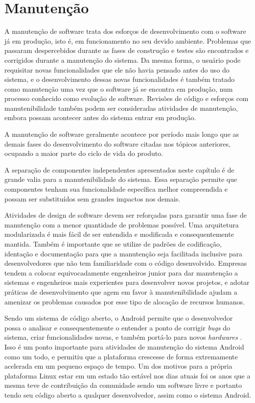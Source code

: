 \section{Manutenção}

A manutenção de software trata dos esforços de desenvolvimento com o software já em produção, isto é, em funcionamento no seu devido ambiente. Problemas que passaram despercebidos durante as fases de construção e testes são encontrados e corrigidos durante a manutenção do sistema. Da mesma forma, o usuário pode requisitar novas funcionalidades que ele não havia pensado antes do uso do sistema, e o desenvolvimento dessas novas funcionalidades é também tratado como manutenção uma vez que o software já se encontra em produção, num processo conhecido como evolução de software. Revisões de código e esforços com manutenibilidade também podem ser consideradas atividades de manutenção, embora possam acontecer antes do sistema entrar em produção.

A manutenção de software geralmente acontece por período mais longo que as demais fases do desenvolvimento do software citadas nos tópicos anteriores, ocupando a maior parte do ciclo de vida do produto.

A separação de componentes independentes apresentados neste capítulo é de grande valia para a manutenibilidade do sistema. Essa separação permite que componentes tenham sua funcionalidade específica melhor compreendida e possam ser substituídos sem grandes impactos nos demais. 

Atividades de design de software devem ser reforçadas para garantir uma fase de manutenção com a menor quantidade de problemas possível. Uma arquitetura modularizada é mais fácil de ser entendida e modificada e consequentemente mantida. Também é importante que se utilize de padrões de codificação, identação e documentação para que a manutenção seja facilitada inclusive para desenvolvedores que não tem familiaridade com o código desenvolvido. Empresas tendem a colocar equivocadamente engenheiros junior para dar manutenção a sistemas e engenheiros mais experientes para desenvolver novos projetos, e adotar práticas de desenvolvimento que agem em favor à manutenibilidade ajudam a amenizar os problemas causados por esse tipo de alocação de recursos humanos.

Sendo um sistema de código aberto, o Android permite que o desenvolvedor possa o analisar e consequentemente o entender a ponto de corrigir \textit{bugs} do sistema, criar funcionalidades novas, e também portá-lo para novos \textit{hardwares} \cite{googleandroid}. Isso é um ponto importante para atividades de manutenção do sistema Android como um todo, e permitiu que a plataforma crescesse de forma extremamente acelerada em um pequeno espaço de tempo. Um dos motivos para a própria plataforma Linux estar em um estado tão estável nos dias atuais foi os anos que a mesma teve de contribuição da comunidade sendo um software livre e portanto tendo seu código aberto a qualquer desenvolvedor, assim como o sistema Android.